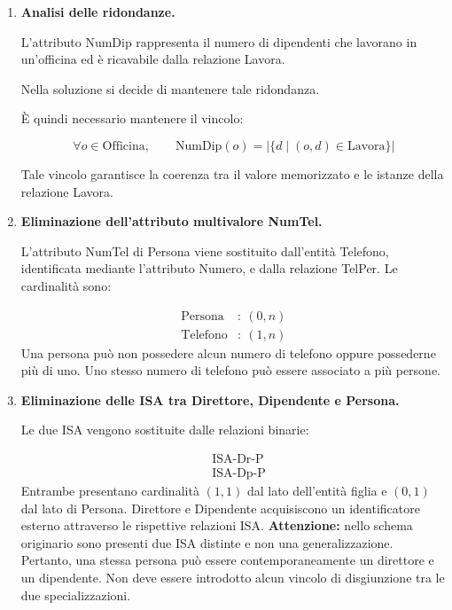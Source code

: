 \begin{enumerate}
    \item \textbf{Analisi delle ridondanze.}

    L'attributo NumDip rappresenta il numero
    di dipendenti che lavorano in un'officina
    ed è ricavabile dalla relazione Lavora.

    Nella soluzione si decide di mantenere
    tale ridondanza.

    È quindi necessario mantenere il vincolo:

    \[
    \forall o\in\text{Officina},\qquad
    \text{NumDip}(o)=
    |\{d\mid(o,d)\in\text{Lavora}\}|
    \]

    Tale vincolo garantisce la coerenza
    tra il valore memorizzato e le istanze
    della relazione Lavora.

    \item \textbf{Eliminazione dell'attributo
    multivalore NumTel.}

    L'attributo NumTel di Persona viene
    sostituito dall'entità Telefono, identificata
    mediante l'attributo Numero, e dalla
    relazione TelPer.
    Le cardinalità sono:

    \[
    \begin{aligned}
    \text{Persona}&:\ (0,n)\\
    \text{Telefono}&:\ (1,n)
    \end{aligned}
    \]
    Una persona può non possedere alcun
    numero di telefono oppure possederne
    più di uno.
    Uno stesso numero di telefono può
    essere associato a più persone.

    \item \textbf{Eliminazione delle ISA
    tra Direttore, Dipendente e Persona.}

    Le due ISA vengono sostituite dalle
    relazioni binarie:

    \[
    \begin{aligned}
    &\text{ISA-Dr-P}\\
    &\text{ISA-Dp-P}
    \end{aligned}
    \]
    Entrambe presentano cardinalità $(1,1)$
    dal lato dell'entità figlia e $(0,1)$
    dal lato di Persona.
    Direttore e Dipendente acquisiscono
    un identificatore esterno attraverso
    le rispettive relazioni ISA.
    \textbf{Attenzione:} nello schema originario
    sono presenti due ISA distinte e non
    una generalizzazione.
    Pertanto, una stessa persona può essere
    contemporaneamente un direttore e un
    dipendente.
    Non deve essere introdotto alcun vincolo
    di disgiunzione tra le due specializzazioni.


\end{enumerate}
